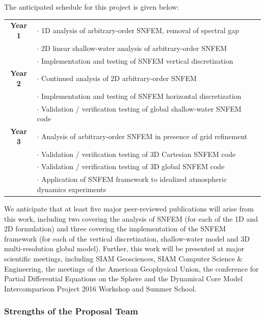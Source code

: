 \documentclass[11pt]{article}
\begin{document}
The anticipated schedule for this project is given below:

\vspace{-0.3cm}
\begin{tabularx}{\textwidth}{cX}
\hline
\textbf{Year 1} & $\cdot$ 1D analysis of arbitrary-order SNFEM, removal of spectral gap \\
& $\cdot$ 2D linear shallow-water analysis of arbitrary-order SNFEM \\
& $\cdot$ Implementation and testing of SNFEM vertical discretization \\
\hline
\textbf{Year 2} & $\cdot$ Continued analysis of 2D arbitrary-order SNFEM \\
& $\cdot$ Implementation and testing of SNFEM horizontal discretization \\
& $\cdot$ Validation / verification testing of global shallow-water SNFEM code \\
\hline
\textbf{Year 3} & $\cdot$ Analysis of arbitrary-order SNFEM in presence of grid refinement \\
& $\cdot$ Validation / verification testing of 3D Cartesian SNFEM code \\
& $\cdot$ Validation / verification testing of 3D global SNFEM code \\
& $\cdot$ Application of SNFEM framework to idealized atmospheric dynamics experiments \\
\hline
\end{tabularx}

We anticipate that at least five major peer-reviewed publications will arise from this work, including two covering the analysis of SNFEM (for each of the 1D and 2D formulation) and three covering the implementation of the SNFEM framework (for each of the vertical discretization, shallow-water model and 3D multi-resolution global model). Further, this work will be presented at major scientific meetings, including SIAM Geosciences, SIAM Computer Science \& Engineering, the meetings of the American Geophysical Union, the conference for Partial Differential Equations on the Sphere and the Dynamical Core Model Intercomparison Project 2016 Workshop and Summer School.

\subsubsection{Strengths of the Proposal Team}
\end{document}
